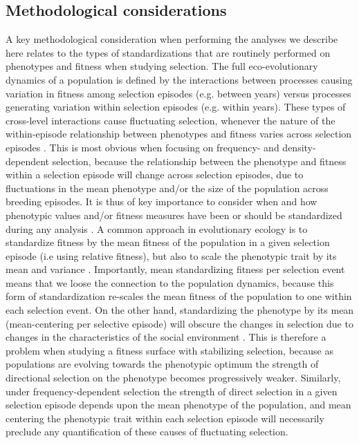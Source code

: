 \documentclass{article}
\begin{document}
\subsection{Methodological considerations}
 A key methodological consideration when performing the analyses we describe here relates to the types of standardizations that are routinely performed on phenotypes and fitness when studying selection. The full eco-evolutionary dynamics of a population is defined by the interactions between processes causing variation in fitness among selection episodes (e.g. between years) versus processes generating variation within selection episodes (e.g. within years). These types of cross-level interactions cause fluctuating selection, whenever the nature of the within-episode relationship between phenotypes and fitness varies across selection episodes \citep{Araya-Ajoy2020}. This is most obvious when focusing on frequency- and density-dependent selection, because the relationship between the phenotype and fitness within a selection episode will change across selection episodes, due to fluctuations in the mean phenotype and/or the size of the population across breeding episodes. It is thus of key importance to consider when and how phenotypic values and/or fitness measures have been or should be standardized during any analysis \citep{DeLisle2017}. A common approach in evolutionary ecology is to standardize fitness by the mean fitness of the population in a given selection episode (i.e using relative fitness), but also to scale the phenotypic trait by its mean and variance \citep{Dingemanse2021}. Importantly, mean standardizing fitness per selection event means that we loose the connection to the population dynamics, because this form of standardization re-scales the mean fitness of the population to one within each selection event. On the other hand, standardizing the phenotype by its mean (mean-centering per selective episode) will obscure the changes in selection due to changes in the characteristics of the social environment \citep{Araya-Ajoy2020}. This is therefore a problem when studying a fitness surface with stabilizing selection, because as populations are evolving towards the phenotypic optimum the strength of directional selection on the phenotype becomes progressively weaker. Similarly, under frequency-dependent selection the strength of direct selection in a given selection episode depends upon the mean phenotype of the population, and mean centering the phenotypic trait within each selection episode will necessarily preclude any quantification of these causes of fluctuating selection.  
\end{document}
